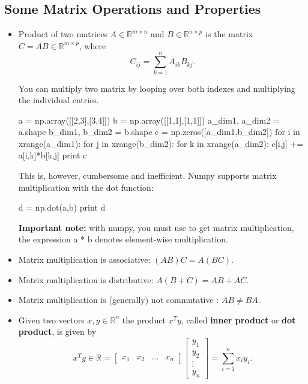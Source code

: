 \subsection{Some Matrix Operations and Properties}
\begin{itemize}
\item Product of two matrices $A \in \mathbb{R}^{m\times n}$ and $B \in \mathbb{R}^{n\times p}$
is the matrix $C=AB \in \mathbb{R}^{m\times p}$, where 
\begin{equation*}
C_{ij}=\sum\limits_{k=1}^{n}A_{ik}B_{kj}.
\end{equation*}

\begin{exercise}
You can multiply two matrix by looping over both indexes and multiplying the individual entries.
\begin{python}
a = np.array([[2,3],[3,4]])
b = np.array([[1,1],[1,1]])
a_dim1, a_dim2 = a.shape
b_dim1, b_dim2 = b.shape
c = np.zeros([a_dim1,b_dim2])
for i in xrange(a_dim1):
   for j in xrange(b_dim2):
       for k in xrange(a_dim2):
          c[i,j] += a[i,k]*b[k,j]
print c
\end{python}

This is, however, cumbersome and inefficient. Numpy supports matrix
multiplication with the dot function:

\begin{python}
d = np.dot(a,b)
print d
\end{python}

\textbf{Important note:} with numpy, you must use  to get matrix
multiplication, the expression {a * b} denotes element-wise multiplication.
\end{exercise}

\item Matrix multiplication is associative: $(AB)C= A(BC)$.
\item Matrix multiplication is distributive: $A(B+C)= AB + AC$.
\item Matrix multiplication is (generally) not commutative : $AB \neq BA$.
\item Given two vectors $x,y \in \mathbb{R}^{n}$ the product $x^{T}y$, called {\bf inner product}
or {\bf dot product}, is given by
\begin{equation*}
x^{T}y \in \mathbb{R} = \left[\begin{array}{cccc}
x_{1}&x_{2}&\ldots&x_{n}\end{array}\right] \left[\begin{array}{c}
y_{1} \\
y_{2} \\
\vdots \\
y_{n}
\end{array}\right] = \sum\limits_{i=1}^{n}x_{i}y_{i}.
\end{equation*}


\end{itemize}
